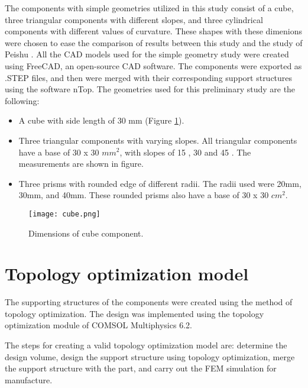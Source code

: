 \documentclass[../main.tex]{subfiles}
\begin{document}
The components with simple geometries utilized in this study consist of a cube, three triangular
components with different slopes, and three cylindrical components with different values of
curvature. These shapes with these dimenions were chosen to ease the comparison of results between this study and the study of Peishu \cite{chungpei-hsuStudyLatticeSupport2024}. All the CAD models
used for the simple geometry study were created using FreeCAD, an open-source CAD software. The components were exported as .STEP files, and then were merged with their corresponding support structures using the software nTop. The geometries used for this preliminary study are the following:

\begin{itemize}
  \item A cube with side length of 30 mm (Figure \ref{fig:cube}).
  \item Three triangular components with varying slopes. All triangular components have a base of 30 x 30 $mm^2$, with slopes of 15 \degree, 30  \degree and 45 \degree. The measurements are shown in figure. 
  \item Three prisms with rounded edge of different radii. The radii used were 20mm, 30mm, and 40mm. These rounded prisms also have a base of 30 x 30 $cm^2$. 
\end{itemize}

\begin{figure}
	\begin{center}
		\texttt{[image: cube.png]}
	\end{center}
	\caption{Dimensions of cube component.}\label{fig:cube}
\end{figure}


\section{Topology optimization model}

The supporting structures of the components were created using the method of topology optimization. The design was implemented using the topology optimization module of COMSOL Multiphysics 6.2.  

The steps for creating a valid topology optimization model are: determine the design volume, design the support structure using topology optimization, merge the support structure with the part, and carry out the FEM simulation for manufacture.
\end{document}
